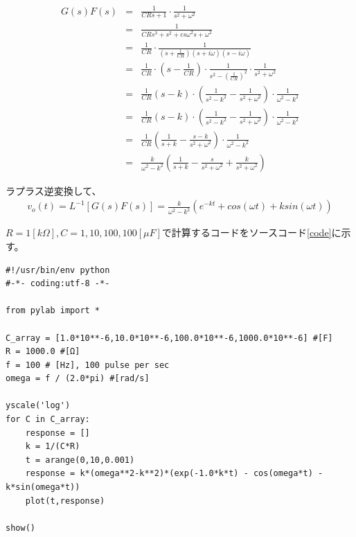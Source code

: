 \documentclass[]{jsarticle}
\begin{document}
\begin{eqnarray*}
G(s)F(s) & = & \frac{1}{CRs+1} \cdot \frac{1}{s^{2}+\omega^{2}} \\
             & = & \frac{1}{CR s^{3}+s^{2}+cs\omega^{2}s+\omega^{2}} \\
             & = & \frac{1}{CR} \cdot \frac{1}{\left( s+\frac{1}{CR} \right)\left( s+i\omega \right)\left( s - i\omega\right)} \\
             & = & \frac{1}{CR} \cdot \left( s - \frac{1}{CR} \right) \cdot \frac{1}{s^{2} - \left( \frac{1}{CR} \right) ^{2}} \cdot \frac{1}{s^{2}+\omega^{2}} \\
             & = & \frac{1}{CR} \left( s - k \right) \cdot \left( \frac{1}{s^{2}-k^{2}} - \frac{1}{s^{2}+\omega^{2}} \right) \cdot \frac{1}{\omega^{2} - k^{2}} \\
             & = & \frac{1}{CR} \left( s - k \right) \cdot \left( \frac{1}{s^{2}-k^{2}} - \frac{1}{s^{2}+\omega^{2}} \right) \cdot \frac{1}{\omega^{2} - k^{2}} \\
             & = & \frac{1}{CR} \left( \frac{1}{s+k} - \frac{s-k}{s^{2}+\omega^{2}}\right) \cdot \frac{1}{\omega^{2} - k^{2}} \\
             & = & \frac{k}{\omega^{2}-k^{2}}\left( \frac{1}{s+k} - \frac{s}{s^{2}+\omega^{2}} + \frac{k}{s^{2}+\omega^{2}}\right)
\end{eqnarray*}

ラプラス逆変換して、
\begin{eqnarray*}
v_{o}(t) = L^{-1}[G(s)F(s)] = \frac{k}{\omega^{2}-k^{2}}\left( e^{-kt} + cos(\omega t) + k sin(\omega t)\right)
\end{eqnarray*}

$R = 1 [k \Omega], C=1,10,100,100[\mu F] $で計算するコードをソースコード\ref{code}に示す。

\begin{lstlisting}[caption=正弦波入力に対する応答解析,label=code]
#!/usr/bin/env python
#-*- coding:utf-8 -*-

from pylab import *

C_array = [1.0*10**-6,10.0*10**-6,100.0*10**-6,1000.0*10**-6] #[F]
R = 1000.0 #[Ω]
f = 100 # [Hz], 100 pulse per sec
omega = f / (2.0*pi) #[rad/s]

yscale('log')
for C in C_array:
    response = [] 
    k = 1/(C*R)
    t = arange(0,10,0.001)
    response = k*(omega**2-k**2)*(exp(-1.0*k*t) - cos(omega*t) - k*sin(omega*t))
    plot(t,response)

show()
\end{lstlisting}
\end{document}
